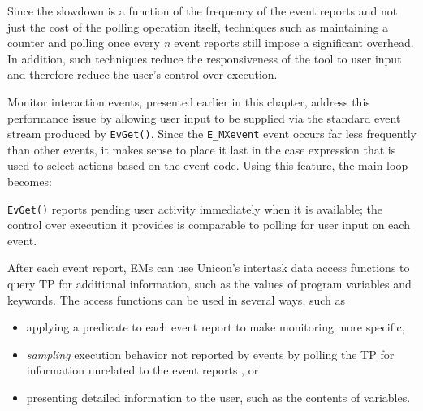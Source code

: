 Since the slowdown is a function of the frequency of the event reports and
not just the cost of the polling operation itself, techniques such as
maintaining a counter and polling once every {\em n\/} event reports still
impose a significant overhead.  In addition, such techniques reduce the
responsiveness of the tool to user input and therefore reduce the user's
control over execution.

Monitor interaction events, presented earlier in this chapter,
address this performance issue by allowing user input to be supplied
via the standard event stream produced by {\tt EvGet()}.
Since the {\tt E\_MXevent} event occurs far less
frequently than other events, it makes sense to place it last in the
case expression that is used to select actions based on the event
code.  Using this feature, the main loop becomes: 

 
{\tt EvGet()} reports pending user activity immediately when it is
available; the control over execution it provides is comparable to
polling for user input on each event.


\vspace{1pc}


\vspace{0.25pc}
\noindent
After each event report, EMs can use Unicon's intertask data access
functions to query TP for additional information, such as the values
of program variables and keywords.  The access functions can be used
in several ways, such as

\begin{itemize}
\item applying a predicate to each event report to make monitoring
	more specific,
\item {\em sampling\/} execution behavior not reported by events by
	polling the TP for information unrelated to the event reports
	\cite{Ogle90}, or 
\item presenting detailed information to the user, such as the
	contents of variables.
\end{itemize}


